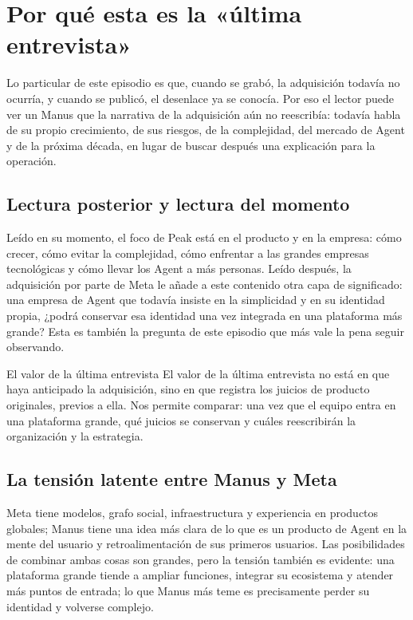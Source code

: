 \section{Por qué esta es la «última entrevista»}

Lo particular de este episodio es que, cuando se grabó, la adquisición todavía no ocurría, y cuando se publicó, el desenlace ya se conocía. Por eso el lector puede ver un Manus que la narrativa de la adquisición aún no reescribía: todavía habla de su propio crecimiento, de sus riesgos, de la complejidad, del mercado de Agent y de la próxima década, en lugar de buscar después una explicación para la operación.

\subsection{Lectura posterior y lectura del momento}

Leído en su momento, el foco de Peak está en el producto y en la empresa: cómo crecer, cómo evitar la complejidad, cómo enfrentar a las grandes empresas tecnológicas y cómo llevar los Agent a más personas. Leído después, la adquisición por parte de Meta le añade a este contenido otra capa de significado: una empresa de Agent que todavía insiste en la simplicidad y en su identidad propia, ¿podrá conservar esa identidad una vez integrada en una plataforma más grande? Esta es también la pregunta de este episodio que más vale la pena seguir observando.

\begin{knowledgebox}{El valor de la última entrevista}
El valor de la última entrevista no está en que haya anticipado la adquisición, sino en que registra los juicios de producto originales, previos a ella. Nos permite comparar: una vez que el equipo entra en una plataforma grande, qué juicios se conservan y cuáles reescribirán la organización y la estrategia.
\end{knowledgebox}

\subsection{La tensión latente entre Manus y Meta}

Meta tiene modelos, grafo social, infraestructura y experiencia en productos globales; Manus tiene una idea más clara de lo que es un producto de Agent en la mente del usuario y retroalimentación de sus primeros usuarios. Las posibilidades de combinar ambas cosas son grandes, pero la tensión también es evidente: una plataforma grande tiende a ampliar funciones, integrar su ecosistema y atender más puntos de entrada; lo que Manus más teme es precisamente perder su identidad y volverse complejo.

